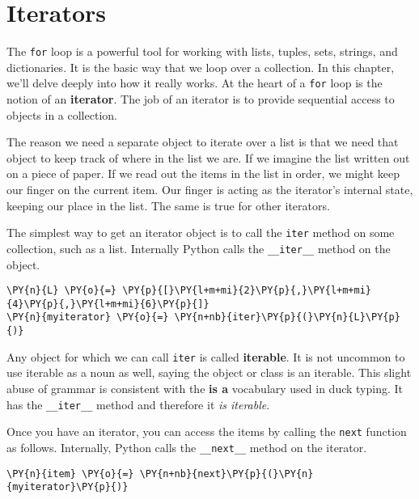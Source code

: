 \section{Iterators}


The \texttt{for} loop is a powerful tool for working with lists, tuples, sets, strings, and dictionaries.
It is the basic way that we loop over a collection.
In this chapter, we’ll delve deeply into how it really works.
At the heart of a \texttt{for} loop is the notion of an \textbf{iterator}.
The job of an iterator is to provide sequential access to objects in a collection.


The reason we need a separate object to iterate over a list is that we need that object to keep track of where in the list we are.  If we imagine the list written out on a piece of paper.  If we read out the items in the list in order, we might keep our finger on the current item.  Our finger is acting as the iterator’s internal state, keeping our place in the list.  The same is true for other iterators.


The simplest way to get an iterator object is to call the \texttt{iter} method on some collection, such as a list.  Internally Python calls the \texttt{\_\_iter\_\_} method on the object.

\begin{Verbatim}[commandchars=\\\{\}]
\PY{n}{L} \PY{o}{=} \PY{p}{[}\PY{l+m+mi}{2}\PY{p}{,}\PY{l+m+mi}{4}\PY{p}{,}\PY{l+m+mi}{6}\PY{p}{]}
\PY{n}{myiterator} \PY{o}{=} \PY{n+nb}{iter}\PY{p}{(}\PY{n}{L}\PY{p}{)}
\end{Verbatim}



Any object for which we can call \texttt{iter} is called \textbf{iterable}.  It is not uncommon to use iterable as a noun as well, saying the object or class is an iterable.  This slight abuse of grammar is consistent with the \textbf{is a} vocabulary used in duck typing.  It has the \texttt{\_\_iter\_\_} method and therefore it \emph{is iterable}.


Once you have an iterator, you can access the items by calling the \texttt{next} function as follows.  Internally, Python calls the \texttt{\_\_next\_\_} method on the iterator.

\begin{Verbatim}[commandchars=\\\{\}]
\PY{n}{item} \PY{o}{=} \PY{n+nb}{next}\PY{p}{(}\PY{n}{myiterator}\PY{p}{)}
\end{Verbatim}




